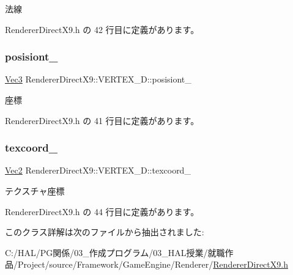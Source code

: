 法線 



 Renderer\+Direct\+X9.\+h の 42 行目に定義があります。

\mbox{\label{class_renderer_direct_x9_1_1_v_e_r_t_e_x__3_d_a15e30709ae06aa5bc8e73054e9f160e9}} 
\subsubsection{\texorpdfstring{posisiont\+\_\+}{posisiont\_}}
{\footnotesize\ttfamily \mbox{\hyperlink{_vector3_d_8h_ab16f59e4393f29a01ec8b9bbbabbe65d}{Vec3}} Renderer\+Direct\+X9\+::\+V\+E\+R\+T\+E\+X\+\_\+D\+::posisiont\+\_\+}



座標 



 Renderer\+Direct\+X9.\+h の 41 行目に定義があります。

\mbox{\label{class_renderer_direct_x9_1_1_v_e_r_t_e_x__3_d_a240251febb14de7b0a6525d3b305f516}} 
\subsubsection{\texorpdfstring{texcoord\+\_\+}{texcoord\_}}
{\footnotesize\ttfamily \mbox{\hyperlink{_vector3_d_8h_a5ef6e95dfc5f9d3820b71772d99bbc25}{Vec2}} Renderer\+Direct\+X9\+::\+V\+E\+R\+T\+E\+X\+\_\+D\+::texcoord\+\_\+}



テクスチャ座標 



 Renderer\+Direct\+X9.\+h の 44 行目に定義があります。



このクラス詳解は次のファイルから抽出されました\+:\begin{DoxyCompactItemize}
\item 
C\+:/\+H\+A\+L/\+P\+G関係/03\+\_\+作成プログラム/03\+\_\+\+H\+A\+L授業/就職作品/\+Project/source/\+Framework/\+Game\+Engine/\+Renderer/\mbox{\hyperlink{_renderer_direct_x9_8h}{Renderer\+Direct\+X9.\+h}}\end{DoxyCompactItemize}

